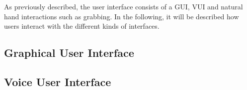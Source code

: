 As previously described, the user interface consists of a GUI, VUI and natural hand interactions such as grabbing.
In the following, it will be described how users interact with the different kinds of interfaces. 

\subsection{\label{sec::GraphicalUserInterface}Graphical User Interface}

\subsection{\label{sec::VoiceUserInterface}Voice User Interface}
